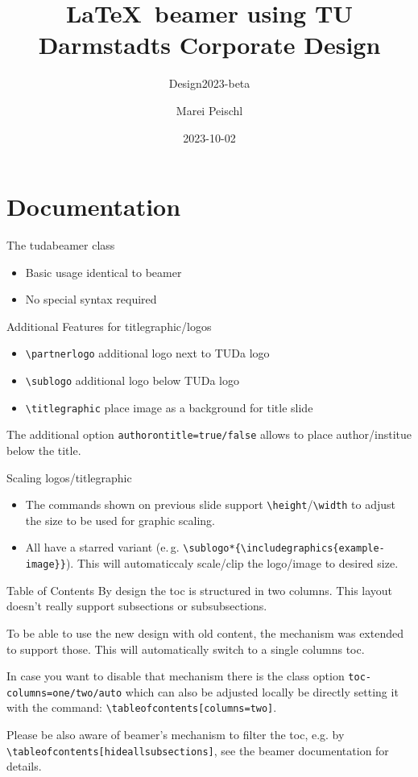 \documentclass[
	english, %
	design=2023, %
	authorontitle=true,
	]{tudabeamer}
\title[TUDaBeamer2023]{\LaTeX~beamer using TU Darmstadts Corporate Design}
\subtitle{Design2023-beta}
\author[M. Peischl]{Marei Peischl}
\institute{pei\TeX}
\date{2023-10-02}
\newcommand*{\code}[1]{\texttt{#1}}
\begin{document}
\maketitle

\tableofcontents

\section{Documentation}
\sectionpage

\begin{frame}{The tudabeamer class}
\begin{itemize}
	\item Basic usage identical to beamer
	\item No special syntax required
\end{itemize}
\end{frame}

\begin{frame}{Additional Features for titlegraphic/logos}
\begin{itemize}
	\item \code{\textbackslash{}partnerlogo} additional logo next to TUDa logo
	\item \code{\textbackslash{}sublogo} additional logo below TUDa logo
	\item \code{\textbackslash{}titlegraphic} place image as a background for title slide
\end{itemize}
	The additional option \code{authorontitle=true/false} allows to place author/institue below the title.
\end{frame}

\begin{frame}{Scaling logos/titlegraphic}
\begin{itemize}
\item The commands shown on previous slide support \code{\textbackslash{}height}/\code{\textbackslash{}width} to adjust the size to be used for graphic scaling.
\item All have a starred variant (e.\,g. \code{\textbackslash{}sublogo*\{\textbackslash{}includegraphics\{example-image\}\}}). This will automaticcaly scale/clip the logo/image to desired size.
\end{itemize}
\end{frame}

\begin{frame}{Table of Contents}
By design the toc is structured in two columns. This layout doesn't really support subsections or subsubsections.

To be able to use the new design with old content, the mechanism was extended to support those. This will automatically switch to a single columns toc.

In case you want to disable that mechanism there is the class option \code{toc-columns=one/two/auto} which can also be adjusted locally be directly setting it with the command: \code{\textbackslash{}tableofcontents[columns=two]}.

Please be also aware of beamer's mechanism to filter the toc, e.g. by \code{\textbackslash{}tableofcontents[hideallsubsections]}, see the beamer documentation for details.
\end{frame}
\end{document}
